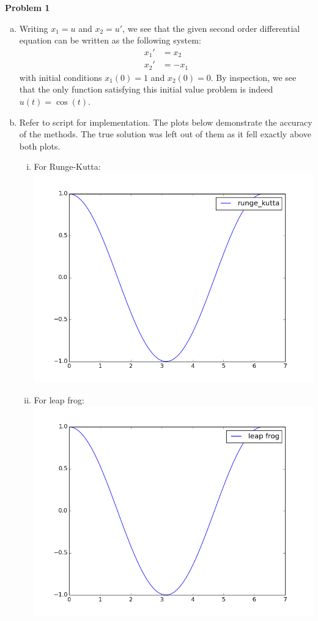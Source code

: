 \documentclass[a4paper, 12pt]{article}
\begin{document}
\begin{center}
	\textbf{Problem 1}
\end{center}

\begin{enumerate}[(a)]
	\item Writing $x_1 = u$ and $x_2 = u'$, we see that the given second order differential equation can be written as the following system:
	\begin{align*}
		x_1' &= x_2\\
		x_2' &= -x_1
	\end{align*}
	with initial conditions $x_1(0) = 1$ and $x_2(0) = 0$. By inspection, we see that the only function satisfying this initial value problem is indeed $u(t) = \cos(t)$.
	
	\item Refer to script for implementation. The plots below demonstrate the accuracy of the methods. The true solution was left out of them as it fell exactly above both plots.
	\begin{enumerate}[(i)]
		\item For Runge-Kutta: \\
	  		\includegraphics[scale=.5]{fig1_1.png}\hfill
	  	\item For leap frog: \\
	  		\includegraphics[scale=.5]{fig1_2.png}\hfill


\end{enumerate}
\end{enumerate}
\end{document}
